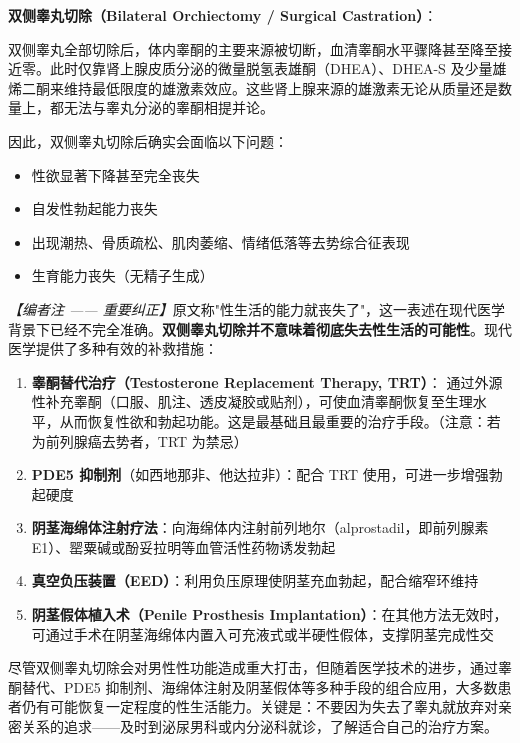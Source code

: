 \vspace{0.5em}
\noindent\textbf{双侧睾丸切除（Bilateral Orchiectomy / Surgical Castration）}：

双侧睾丸全部切除后，体内睾酮的主要来源被切断，血清睾酮水平骤降甚至降至接近零。此时仅靠肾上腺皮质分泌的微量脱氢表雄酮（DHEA）、DHEA-S 及少量雄烯二酮来维持最低限度的雄激素效应。这些肾上腺来源的雄激素无论从质量还是数量上，都无法与睾丸分泌的睾酮相提并论。

因此，双侧睾丸切除后确实会面临以下问题：
\begin{itemize}
	\item 性欲显著下降甚至完全丧失
	\item 自发性勃起能力丧失
	\item 出现潮热、骨质疏松、肌肉萎缩、情绪低落等去势综合征表现
	\item 生育能力丧失（无精子生成）
\end{itemize}

\noindent\textit{【编者注 —— 重要纠正】}原文称"性生活的能力就丧失了"，这一表述在现代医学背景下已经不完全准确。\textbf{双侧睾丸切除并不意味着彻底失去性生活的可能性}。现代医学提供了多种有效的补救措施：

\begin{enumerate}
	\item \textbf{睾酮替代治疗（Testosterone Replacement Therapy, TRT）}：
	通过外源性补充睾酮（口服、肌注、透皮凝胶或贴剂），可使血清睾酮恢复至生理水平，从而恢复性欲和勃起功能。这是最基础且最重要的治疗手段。（注意：若为前列腺癌去势者，TRT 为禁忌）

	\item \textbf{PDE5 抑制剂}（如西地那非、他达拉非）：配合 TRT 使用，可进一步增强勃起硬度

	\item \textbf{阴茎海绵体注射疗法}：向海绵体内注射前列地尔（alprostadil，即前列腺素 E1）、罂粟碱或酚妥拉明等血管活性药物诱发勃起

	\item \textbf{真空负压装置（EED）}：利用负压原理使阴茎充血勃起，配合缩窄环维持

	\item \textbf{阴茎假体植入术（Penile Prosthesis Implantation）}：在其他方法无效时，可通过手术在阴茎海绵体内置入可充液式或半硬性假体，支撑阴茎完成性交
\end{enumerate}

\begin{tcolorbox}[colback=pink!5!white,colframe=red!50!black,title=贴心小叮咛]
尽管双侧睾丸切除会对男性性功能造成重大打击，但随着医学技术的进步，通过睾酮替代、PDE5 抑制剂、海绵体注射及阴茎假体等多种手段的组合应用，大多数患者仍有可能恢复一定程度的性生活能力。关键是：不要因为失去了睾丸就放弃对亲密关系的追求——及时到泌尿男科或内分泌科就诊，了解适合自己的治疗方案。
\end{tcolorbox}

